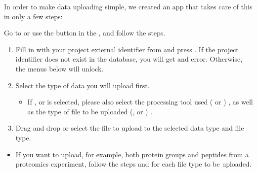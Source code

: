 \documentclass[letterpaper,10pt,english]{sphinxmanual}
\begin{document}
In order to make data uploading simple, we created an app that takes care of this in only a few steps:

Go to  or use the  button in the , and follow the steps.
\begin{enumerate}
%
\item {} 
Fill in  with your project external identifier from {\hyperref[\detokenize{getting_started/create-new-project:project-creation}]{}} and press .  If the project identifier does not exist in the database, you will get and error. Otherwise, the menus below will unlock.

\item {} 
Select the type of data you will upload first. 
\begin{itemize}
\item {} 
If ,  or  is selected, please also select the processing tool used ( or ) , as well as the type of file to be uploaded (,  or ) .

\end{itemize}

\item {} 
Drag and drop or select the file to upload to the selected data type and file type. 

\end{enumerate}
\begin{itemize}
\item {} 
If you want to upload, for example, both protein groups and peptides from a proteomics experiment, follow the steps  and  for each file type to be uploaded.

\end{itemize}
\end{document}
